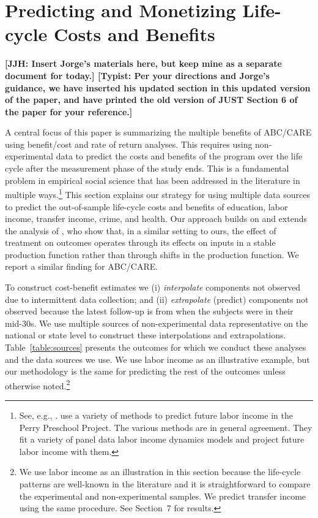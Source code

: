 \section{Predicting and Monetizing Life-cycle Costs and Benefits}\label{section:cbamethodology}

\textbf{[JJH: Insert Jorge's materials here, but keep mine as a separate document for today.] [Typist: Per your directions and Jorge's guidance, we have inserted his updated section in this updated version of the paper, and have printed the old version of JUST Section 6 of the paper for your reference.]}

A central focus of this paper is summarizing the multiple benefits of ABC/CARE using benefit/cost and rate of return analyses. This requires using non-experimental data to predict the costs and benefits of the program over the life cycle after the measurement phase of the study ends. This is a fundamental problem in empirical social science that has been addressed in the literature in multiple ways.\footnote{See, e.g., \cite{Heckman_Lochner_ea_2006_HEE}. \citet{Heckman_Moon_etal_2010_RateofReturn} use a variety of methods to predict future labor income in the Perry Preschool Project. The various methods are in general agreement. They fit a variety of panel data labor income dynamics models and project future labor income with them.} This section explains our strategy for using multiple data sources to predict the out-of-sample life-cycle costs and benefits of education, labor income, transfer income, crime, and health. Our approach builds on and extends the analysis of \citet{Heckman_Pinto_etal_2013_PerryFactor}, who show that, in a similar setting to ours, the effect of treatment on outcomes operates through its effects on inputs in a stable production function rather than through shifts in the production function. We report a similar finding for ABC/CARE.

To construct cost-benefit estimates we (i) \textit{interpolate} components not observed due to intermittent data collection; and (ii) \textit{extrapolate} (predict) components not observed because the latest follow-up is from when the subjects were in their mid-30s. We use multiple sources of non-experimental data representative on the national or state level to construct these interpolations and extrapolations. Table~\ref{table:sources} presents the outcomes for which we conduct these analyses and the data sources we use. We use labor income as an illustrative example, but our methodology is the same for predicting the rest of the outcomes unless otherwise noted.\footnote{We use labor income as an illustration in this section because the life-cycle patterns are well-known in the literature and it is straightforward to compare the experimental and non-experimental samples. We predict transfer income using the same procedure. See Section~7 for results.}

